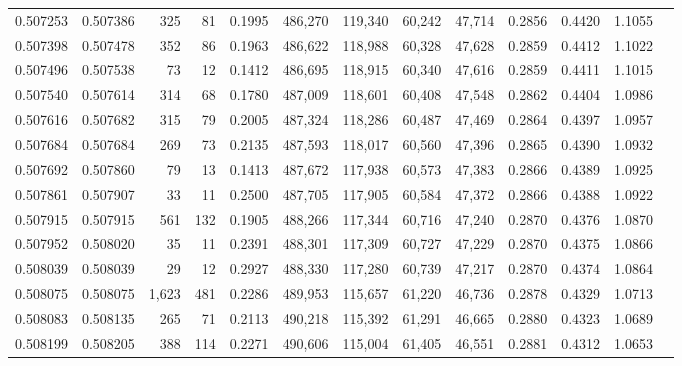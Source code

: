 \begin{tabular}{rrrrrrrrrrrrr}
0.507253 & 0.507386 &   325 &    81 &                                     0.1995 & 486,270 & 119,340 &  60,242 &  47,714 & 0.2856 & 0.4420 & 1.1055 \\
0.507398 & 0.507478 &   352 &    86 &                                     0.1963 & 486,622 & 118,988 &  60,328 &  47,628 & 0.2859 & 0.4412 & 1.1022 \\
0.507496 & 0.507538 &    73 &    12 &                                     0.1412 & 486,695 & 118,915 &  60,340 &  47,616 & 0.2859 & 0.4411 & 1.1015 \\
0.507540 & 0.507614 &   314 &    68 &                                     0.1780 & 487,009 & 118,601 &  60,408 &  47,548 & 0.2862 & 0.4404 & 1.0986 \\
0.507616 & 0.507682 &   315 &    79 &                                     0.2005 & 487,324 & 118,286 &  60,487 &  47,469 & 0.2864 & 0.4397 & 1.0957 \\
0.507684 & 0.507684 &   269 &    73 &                                     0.2135 & 487,593 & 118,017 &  60,560 &  47,396 & 0.2865 & 0.4390 & 1.0932 \\
0.507692 & 0.507860 &    79 &    13 &                                     0.1413 & 487,672 & 117,938 &  60,573 &  47,383 & 0.2866 & 0.4389 & 1.0925 \\
0.507861 & 0.507907 &    33 &    11 &                                     0.2500 & 487,705 & 117,905 &  60,584 &  47,372 & 0.2866 & 0.4388 & 1.0922 \\
0.507915 & 0.507915 &   561 &   132 &                                     0.1905 & 488,266 & 117,344 &  60,716 &  47,240 & 0.2870 & 0.4376 & 1.0870 \\
0.507952 & 0.508020 &    35 &    11 &                                     0.2391 & 488,301 & 117,309 &  60,727 &  47,229 & 0.2870 & 0.4375 & 1.0866 \\
0.508039 & 0.508039 &    29 &    12 &                                     0.2927 & 488,330 & 117,280 &  60,739 &  47,217 & 0.2870 & 0.4374 & 1.0864 \\
0.508075 & 0.508075 & 1,623 &   481 &                                     0.2286 & 489,953 & 115,657 &  61,220 &  46,736 & 0.2878 & 0.4329 & 1.0713 \\
0.508083 & 0.508135 &   265 &    71 &                                     0.2113 & 490,218 & 115,392 &  61,291 &  46,665 & 0.2880 & 0.4323 & 1.0689 \\
0.508199 & 0.508205 &   388 &   114 &                                     0.2271 & 490,606 & 115,004 &  61,405 &  46,551 & 0.2881 & 0.4312 & 1.0653 \\

\end{tabular}
